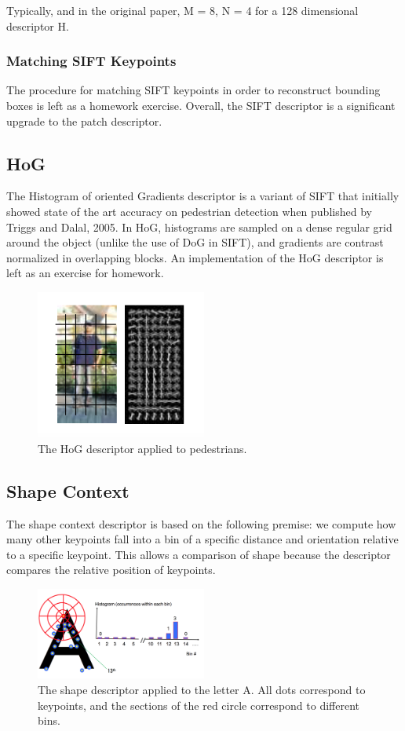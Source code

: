 \documentclass[a4paper, 12pt]{article}
\numberwithin{equation}{section}
\begin{document}
\noindent Typically, and in the original paper, M = 8, N = 4 for a 128 dimensional descriptor H. 


\subsubsection{Matching SIFT Keypoints}
The procedure for matching SIFT keypoints in order to reconstruct bounding boxes is left as a homework exercise. Overall, the SIFT descriptor is a significant upgrade to the patch descriptor. 

\subsection{HoG}
The Histogram of oriented Gradients descriptor is a variant of SIFT that initially showed state of the art accuracy on pedestrian detection when published by Triggs and Dalal, 2005. In HoG, histograms are sampled on a dense regular grid around the object (unlike the use of DoG in SIFT), and gradients are contrast normalized in overlapping blocks. An implementation of the HoG descriptor is left as an exercise for homework. 

\begin{figure}
\centering
\includegraphics[width=0.5\textwidth]{hog}
\caption{The HoG descriptor applied to pedestrians.}
\end{figure}

\subsection{Shape Context}

The shape context descriptor is based on the following premise: we compute how many other keypoints fall into a bin of a specific distance and orientation relative to a specific keypoint. This allows a comparison of shape because the descriptor compares the relative position of keypoints. 

\begin{figure}[h]
\centering
\includegraphics[width=0.5\textwidth]{shape_desc}
\caption{The shape descriptor applied to the letter A. All dots correspond to keypoints, and the sections of the red circle correspond to different bins.}
\end{figure}
\end{document}
